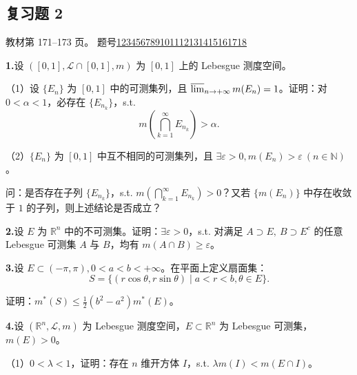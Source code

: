 \documentclass[11pt,a4paper]{article}
\begin{document}
\subsection*{复习题 2}
\noindent 教材第 171--173 页。
\noindent 题号\quad \hyperlink{review-q1}{1}\enspace \hyperlink{review-q2}{2}\enspace \hyperlink{review-q3}{3}\enspace \hyperlink{review-q4}{4}\enspace \hyperlink{review-q5}{5}\enspace \hyperlink{review-q6}{6}\enspace \hyperlink{review-q7}{7}\enspace \hyperlink{review-q8}{8}\enspace \hyperlink{review-q9}{9}\enspace \hyperlink{review-q10}{10}\enspace \hyperlink{review-q11}{11}\enspace \hyperlink{review-q12}{12}\enspace \hyperlink{review-q13}{13}\enspace \hyperlink{review-q14}{14}\enspace \hyperlink{review-q15}{15}\enspace \hyperlink{review-q16}{16}\enspace \hyperlink{review-q17}{17}\enspace \hyperlink{review-q18}{18}\enspace
\par{}\noindent\hypertarget{review-q1}{}\textbf{1.}\quad 设 $([0,1],\mathcal L\cap[0,1],m)$ 为 $[0,1]$ 上的 Lebesgue 测度空间。
\par\noindent （1）设 $\{E_n\}$ 为 $[0,1]$ 中的可测集列，且 $\varlimsup_{n\to+\infty}m(E_n)=1$。证明：对 $0<\alpha<1$，必存在 $\{E_{n_k}\}$，s.t.
\[m\left(\bigcap_{k=1}^\infty E_{n_k}\right)>\alpha.\]
\par\noindent （2）$\{E_n\}$ 为 $[0,1]$ 中互不相同的可测集列，且 $\exists\varepsilon>0,m(E_n)>\varepsilon\ (n\in\mathbb N)$。
\par\noindent 问：是否存在子列 $\{E_{n_k}\}$，s.t. $m\left(\bigcap_{k=1}^\infty E_{n_k}\right)>0$？又若 $\{m(E_n)\}$ 中存在收敛于 $1$ 的子列，则上述结论是否成立？
\par{}\noindent\hypertarget{review-q2}{}\textbf{2.}\quad 设 $E$ 为 $\mathbb R^n$ 中的不可测集。证明：$\exists\varepsilon>0$，s.t. 对满足 $A\supset E,\ B\supset E^c$ 的任意 Lebesgue 可测集 $A$ 与 $B$，均有 $m(A\cap B)\geq\varepsilon$。
\par{}\noindent\hypertarget{review-q3}{}\textbf{3.}\quad 设 $E\subset(-\pi,\pi),0<a<b<+\infty$。在平面上定义扇面集：
\[S=\{(r\cos\theta,r\sin\theta)\mid a<r<b,\theta\in E\}.\]
\par\noindent 证明：$m^*(S)\leq\frac12(b^2-a^2)m^*(E)$。
\par{}\noindent\hypertarget{review-q4}{}\textbf{4.}\quad 设 $(\mathbb R^n,\mathcal L,m)$ 为 Lebesgue 测度空间，$E\subset\mathbb R^n$ 为 Lebesgue 可测集，$m(E)>0$。
\par\noindent （1）$0<\lambda<1$，证明：存在 $n$ 维开方体 $I$，s.t. $\lambda m(I)<m(E\cap I)$。
\end{document}
